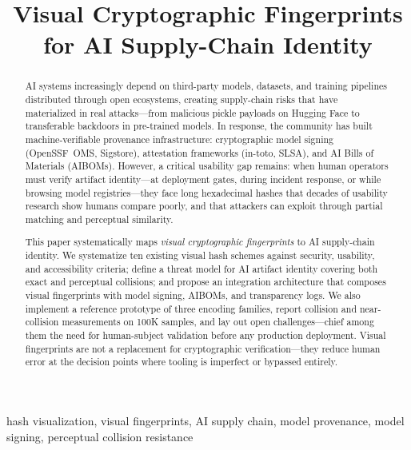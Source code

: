 \documentclass[conference,10pt]{IEEEtran}
\begin{document}
\title{Visual Cryptographic Fingerprints\\for AI Supply-Chain Identity}

\author{
}

\maketitle

\begin{abstract}
AI systems increasingly depend on third-party models, datasets, and training pipelines distributed through open ecosystems, creating supply-chain risks that have materialized in real attacks---from malicious pickle payloads on Hugging Face to transferable backdoors in pre-trained models.
In response, the community has built machine-verifiable provenance infrastructure: cryptographic model signing (OpenSSF~OMS, Sigstore), attestation frameworks (in-toto, SLSA), and AI Bills of Materials (AIBOMs).
However, a critical usability gap remains: when human operators must verify artifact identity---at deployment gates, during incident response, or while browsing model registries---they face long hexadecimal hashes that decades of usability research show humans compare poorly, and that attackers can exploit through partial matching and perceptual similarity.

This paper systematically maps \emph{visual cryptographic fingerprints} to AI supply-chain identity.
We systematize ten existing visual hash schemes against security, usability, and accessibility criteria; define a threat model for AI artifact identity covering both exact and perceptual collisions; and propose an integration architecture that composes visual fingerprints with model signing, AIBOMs, and transparency logs.
We also implement a reference prototype of three encoding families, report collision and near-collision measurements on 100K samples, and lay out open challenges---chief among them the need for human-subject validation before any production deployment.
Visual fingerprints are not a replacement for cryptographic verification---they reduce human error at the decision points where tooling is imperfect or bypassed entirely.
\end{abstract}

\begin{IEEEkeywords}
  hash visualization, visual fingerprints, AI supply chain, model provenance, model signing, perceptual collision resistance
\end{IEEEkeywords}
\end{document}
